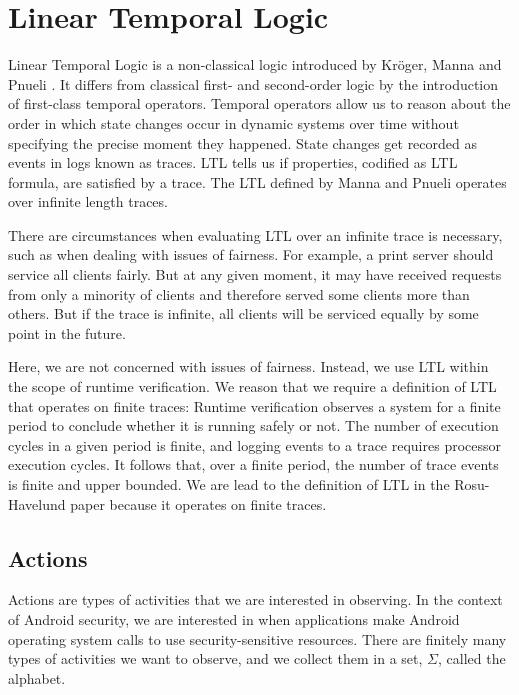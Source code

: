 \chapter{Linear Temporal Logic}
\label{chap:Linear Temporal Logic}

Linear Temporal Logic is a non-classical logic introduced by Kr\"{o}ger, Manna and Pnueli \cite{Pnueli}.  It differs from classical first- and second-order logic by the introduction of first-class temporal operators.  Temporal operators allow us to reason about the order in which state changes occur in dynamic systems over time without specifying the precise moment they happened.  State changes get recorded as events in logs known as traces.  LTL tells us if properties, codified as LTL formula, are satisfied by a trace.  The LTL defined by Manna and Pnueli operates over infinite length traces.

There are circumstances when evaluating LTL over an infinite trace is necessary, such as when dealing with issues of fairness.  For example, a print server should service all clients fairly.  But at any given moment, it may have received requests from only a minority of clients and therefore served some clients more than others.  But if the trace is infinite, all clients will be serviced equally by some point in the future.

Here, we are not concerned with issues of fairness.  Instead, we use LTL within the scope of runtime verification.  We reason that we require a definition of LTL that operates on finite traces:  Runtime verification observes a system for a finite period to conclude whether it is running safely or not.  The number of execution cycles in a given period is finite, and logging events to a trace requires processor execution cycles.  It follows that, over a finite period, the number of trace events is finite and upper bounded.  We are lead to the definition of LTL in the Rosu-Havelund paper \cite{RosuHavelund} because it operates on finite traces.

\section{Actions}
\label{sec: LTL Actions}

Actions are types of activities that we are interested in observing.  In the context of Android security, we are interested in when applications make Android operating system calls to use security-sensitive resources.  There are finitely many types of activities we want to observe, and we collect them in a set, $\Sigma$, called the alphabet.

